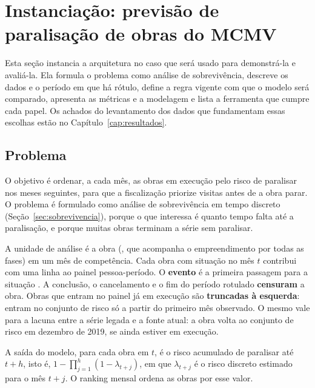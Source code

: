 \section{Instanciação: previsão de paralisação de obras do MCMV}
\label{sec:caso}

Esta seção instancia a arquitetura no caso que será usado para demonstrá-la e avaliá-la. Ela formula o problema como análise de sobrevivência, descreve os dados e o período em que há rótulo, define a regra vigente com que o modelo será comparado, apresenta as métricas e a modelagem e lista a ferramenta que cumpre cada papel. Os achados do levantamento dos dados que fundamentam essas escolhas estão no Capítulo~\ref{cap:resultados}.

\subsection{Problema}

O objetivo é ordenar, a cada mês, as obras em execução pelo risco de paralisar nos meses seguintes, para que a fiscalização priorize visitas antes de a obra parar. O problema é formulado como análise de sobrevivência em tempo discreto (Seção~\ref{sec:sobrevivencia}), porque o que interessa é quanto tempo falta até a paralisação, e porque muitas obras terminam a série sem paralisar.

A unidade de análise é a obra (, que acompanha o empreendimento por todas as fases) em um mês de competência. Cada obra com situação  no mês $t$ contribui com uma linha ao painel pessoa-período. O \textbf{evento} é a primeira passagem para a situação . A conclusão, o cancelamento e o fim do período rotulado \textbf{censuram} a obra. Obras que entram no painel já em execução são \textbf{truncadas à esquerda}: entram no conjunto de risco só a partir do primeiro mês observado. O mesmo vale para a lacuna entre a série legada e a fonte atual: a obra volta ao conjunto de risco em dezembro de 2019, se ainda estiver em execução.

A saída do modelo, para cada obra em $t$, é o risco acumulado de paralisar até $t+h$, isto é, $1 - \prod_{j=1}^{h} \left(1 - \lambda_{t+j}\right)$, em que $\lambda_{t+j}$ é o risco discreto estimado para o mês $t+j$. O ranking mensal ordena as obras por esse valor.

